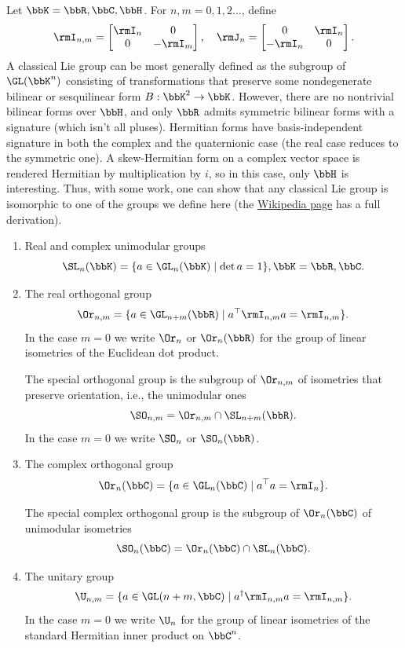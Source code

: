 \begin{example}
    Let $\bbK=\bbR,\bbC,\bbH$. For $n,m=0,1,2\ldots$, define
    \[\rmI_{n,m}=
    \begin{bmatrix}
        \rmI_n&0\\0&-\rmI_m
    \end{bmatrix},\quad \rmJ_n=
    \begin{bmatrix}
        0&\rmI_n\\-\rmI_n&0
    \end{bmatrix}.
    \]
    A classical Lie group can be most generally defined as the subgroup of $\GL(\bbK^n)$ consisting of transformations that preserve some nondegenerate bilinear or sesquilinear form $B:\bbK^2\to \bbK$. However, there are no nontrivial bilinear forms over $\bbH$, and only $\bbR$ admits symmetric bilinear forms with a signature (which isn't all pluses). Hermitian forms have basis-independent signature in both the complex and the quaternionic case (the real case reduces to the symmetric one). A skew-Hermitian form on a complex vector space is rendered Hermitian by multiplication by $i$, so in this case, only $\bbH$ is interesting. Thus, with some work, one can show that any classical Lie group is isomorphic to one of the groups we define here (the \href{https://en.wikipedia.org/wiki/Classical_group}{Wikipedia page} has a full derivation).
    \begin{enumerate}
        \item Real and complex unimodular groups
        \[\SL_n(\bbK)=\{a\in\GL_n(\bbK)\mid \det a=1\}, \bbK=\bbR,\bbC.\]
        \item The real orthogonal group
        \[\Or_{n,m}=\{a\in\GL_{n+m}(\bbR)\mid a^\top  \rmI_{n,m}a=\rmI_{n,m}\}.\]
        In the case $m=0$ we write $\Or_n$ or $\Or_n(\bbR)$ for the group of linear isometries of the Euclidean dot product.

        The special orthogonal group is the subgroup of $\Or_{n,m}$ of isometries that preserve orientation, i.e., the unimodular ones
        \[\SO_{n,m}=\Or_{n,m}\cap \SL_{n+m}(\bbR).\]
        In the case $m=0$ we write $\SO_n$ or $\SO_n(\bbR)$.
        \item The complex orthogonal group
        \[\Or_{n}(\bbC)=\{a\in\GL_{n}(\bbC)\mid a^\top  a=\rmI_{n}\}.\]

        The special complex orthogonal group is the subgroup of $\Or_{n}(\bbC)$ of unimodular isometries
        \[\SO_{n}(\bbC)=\Or_{n}(\bbC)\cap \SL_{n}(\bbC).\]
        \item The unitary group
        \[\U_{n,m}=\{a\in \GL(n+m,\bbC)\mid a^\dagger \rmI_{n,m}a=\rmI_{n,m}\}.\]
        In the case $m=0$ we write $\U_n$ for the group of linear isometries of the standard Hermitian inner product on $\bbC^n$.


\end{enumerate}
\end{example}
